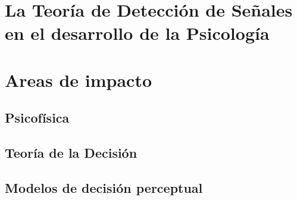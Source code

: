 
\section{La Teoría de Detección de Señales en el desarrollo de la Psicología}



\section{Areas de impacto}

\subsection{Psicofísica}

\subsection{Teoría de la Decisión}

\subsection{Modelos de decisión perceptual}

